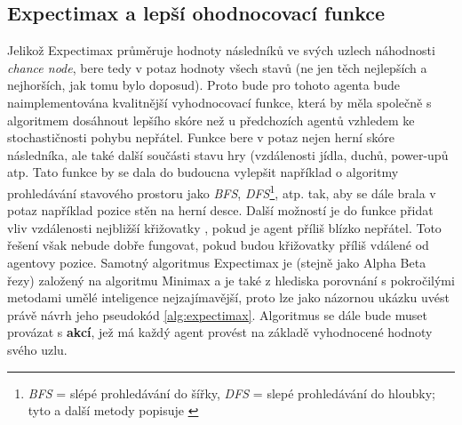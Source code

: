 \subsection*{Expectimax a lepší ohodnocovací funkce}
\label{navrh:expectimax}
Jelikož Expectimax průměruje hodnoty následníků ve svých uzlech náhodnosti \textit{chance node}, bere tedy v potaz hodnoty všech stavů (ne jen těch nejlepších a nejhorších, jak tomu bylo doposud). Proto bude pro tohoto agenta bude naimplementována kvalitnější vyhodnocovací funkce, která by měla společně s algoritmem dosáhnout lepšího skóre než u předchozích agentů vzhledem ke stochastičnosti pohybu nepřátel. Funkce bere v potaz nejen herní skóre následníka, ale také další součásti stavu hry (vzdálenosti jídla, duchů, power-upů atp. Tato funkce by se dala do budoucna vylepšit například o algoritmy prohledávání stavového prostoru jako \textit{BFS}, \textit{DFS}\footnote{\textit{BFS} = slépé prohledávání do šířky, \textit{DFS} = slepé prohledávání do hloubky; tyto a další metody popisuje \cite{AI1}}, atp. tak, aby se dále brala v potaz například pozice stěn na herní desce. Další možností je do funkce přidat vliv vzdálenosti nejbližší křižovatky \cite{controllers}, pokud je agent příliš blízko nepřátel. Toto řešení však nebude dobře fungovat, pokud budou křižovatky příliš vdálené od agentovy pozice. 
\newline
Samotný algoritmus Expectimax je (stejně jako Alpha Beta řezy) založený na algoritmu Minimax a je také z hlediska porovnání s pokročilými metodami umělé inteligence nejzajímavější, proto lze jako názornou ukázku uvést právě návrh jeho pseudokód \ref{alg:expectimax}. Algoritmus se dále bude muset provázat s \textbf{akcí}, jež má každý agent provést na základě vyhodnocené hodnoty svého uzlu.

